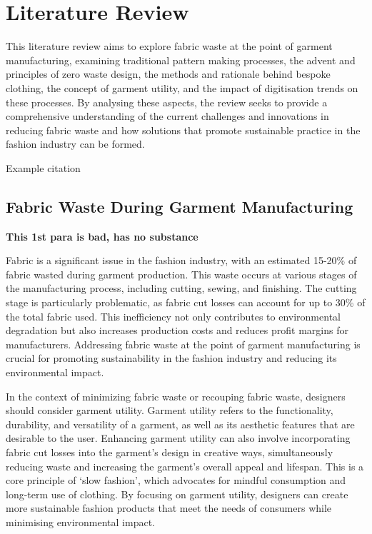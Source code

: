 \chapter{Literature Review}
This literature review aims to explore fabric waste at the point of garment manufacturing, examining traditional pattern making processes, the advent and principles of zero waste design, the methods and rationale behind bespoke clothing, the concept of garment utility, and the impact of digitisation trends on these processes. By analysing these aspects, the review seeks to provide a comprehensive understanding of the current challenges and innovations in reducing fabric waste and how solutions that promote sustainable practice in the fashion industry can be formed. 

Example citation \cite{aldrich_metric_2015}

\section{Fabric Waste During Garment Manufacturing}
\textbf{This 1st para is bad, has no substance}

Fabric is a significant issue in the fashion industry, with an estimated 15-20\% of fabric wasted during garment production. This waste occurs at various stages of the manufacturing process, including cutting, sewing, and finishing. The cutting stage is particularly problematic, as fabric cut losses can account for up to 30\% of the total fabric used. This inefficiency not only contributes to environmental degradation but also increases production costs and reduces profit margins for manufacturers. Addressing fabric waste at the point of garment manufacturing is crucial for promoting sustainability in the fashion industry and reducing its environmental impact.

In the context of minimizing fabric waste or recouping fabric waste, designers should consider garment utility. Garment utility refers to the functionality, durability, and versatility of a garment, as well as its aesthetic features that are desirable to the user. Enhancing garment utility can also involve incorporating fabric cut losses into the garment’s design in creative ways, simultaneously reducing waste and increasing the garment’s overall appeal and lifespan. This is a core principle of ‘slow fashion’, which advocates for mindful consumption and long-term use of clothing. By focusing on garment utility, designers can create more sustainable fashion products that meet the needs of consumers while minimising environmental impact.

